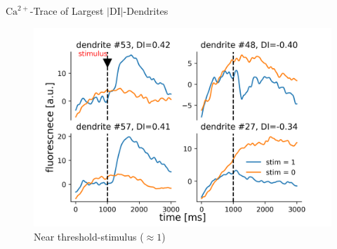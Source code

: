 \documentclass[10pt]{beamer}
\begin{document}
%

\begin{frame}[fragile]{$\text{Ca}^{2+}$-Trace of Largest $|\text{DI}|$-Dendrites}
\begin{center}
	\begin{figure}
      \includegraphics[width=1.0\textwidth]{on_vs_off.png}
      \caption*{Near threshold-stimulus ($\approx 1$)}
	\end{figure}
	\end{center}
\end{frame}

\end{document}
